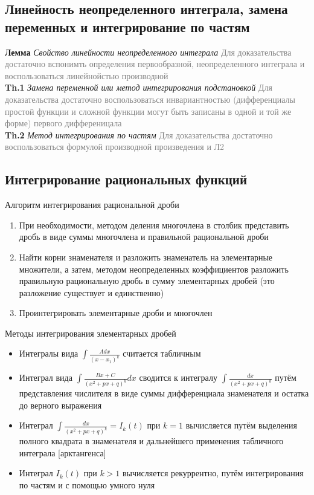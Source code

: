 \subsection{Линейность неопределенного интеграла, замена переменных и интегрирование по частям}

\textbf{Лемма} \textit{Свойство линейности неопределенного интеграла} \textcolor{gray}{Для доказательства достаточно
вспонимть определения первообразной, неопределенного интеграла и воспользоваться линейнойстью производной} \\

\textbf{Th.1} \textit{Замена переменной или метод интегрирования подстановкой} \textcolor{gray}{Для доказательства
достаточно воспользоваться инвариантностью (дифференциалы простой функции и сложной функции могут быть записаны в
одной и той же форме) первого дифференицала} \\

\textbf{Th.2} \textit{Метод интегрирования по частям} \textcolor{gray}{Для доказательства достаточно
воспользоваться формулой производной произведения и Л2}

\subsection{Интегрирование рациональных функций}

Алгоритм интегрирования рациональной дроби

\begin{enumerate}
    \item При необходимости, методом деления многочлена в столбик представить дробь в виде суммы многочлена и
    правильной рациональной дроби
    \item Найти корни знаменателя и разложить знаменатель на элементарные множители, а затем, методом неопределенных коэффициентов разложить правильную
    рациональную дробь в сумму элементарных дробей (это разложение существует и единственно)
    \item Проинтегрировать элементарные дроби и многочлен
\end{enumerate}

Методы интегрирования элементарных дробей

\begin{itemize}
    \item Интегралы вида $\int \frac{Adx}{(x-x_1)^k}$ считается табличным
    \item Интеграл вида $\int \frac{Bx + C}{(x^2 + px + q)^k} dx$ сводится к интегралу $\int \frac{dx}{(x^2 + px
    + q)^k}$ путём представления числителя в виде суммы дифференциала знаменателя и остатка до верного выражения
    \item Интеграл $\int \frac{dx}{(x^2 + px + q)^k} = I_k(t)$ при $k = 1$ вычисляется путём выделения полного
    квадрата в знаменателя и дальнейшего применения табличного интеграла [арктангенса]
    \item Интеграл $I_k(t)$ при $k > 1$ вычисляется рекуррентно, путём интегрирования по частям и с помощью
    умного нуля
\end{itemize}

